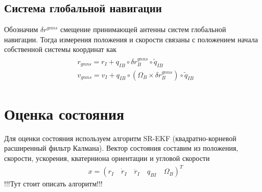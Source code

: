 \documentclass[a4paper,12pt]{article}
\begin{document}
\subsection{Система глобальной навигации}
Обозначим $\delta r^{gnns}$ смещение принимающей антенны систем глобальной навигации. Тогда измерения положения и скорости связаны с положением начала собственной системы координат как
\begin{align} \label{eq:gnns_mes_model}
\begin{split}
&r_{gnns} = r_I + q_{IB} \circ \delta r^{gnns}_B \circ \tilde{q}_{IB} \\
&v_{gnns} = v_I + q_{IB} \circ  (\Omega_B \times \delta r^{gnns}_B) \circ \tilde{q}_{IB}
\end{split}
\end{align}

\section{Оценка состояния}
Для оценки состояния используем алгоритм SR-EKF (квадратно-корневой расширенный фильтр Калмана). Вектор состояния составим из положения, скорости, ускорения, кватерниона ориентации и угловой скорости
\begin{align} 
&x = (r_I \quad \dot{r}_I \quad \ddot{r}_I \quad q_{BI} \quad \Omega_B)^T
\end{align}
!!!Тут стоит описать алгоритм!!!
\end{document}
